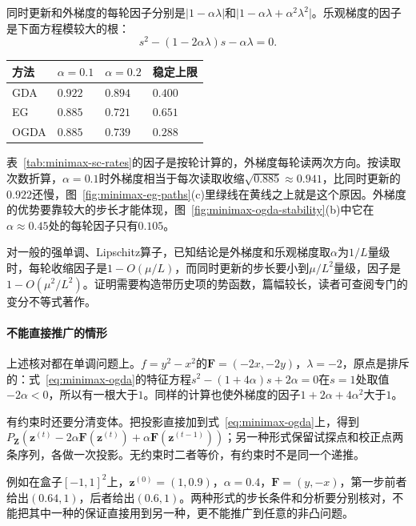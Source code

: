 同时更新和外梯度的每轮因子分别是$\lvert1-\alpha\lambda\rvert$和$\lvert1-\alpha\lambda+\alpha^2\lambda^2\rvert$。乐观梯度的因子是下面方程模较大的根：\[
 s^2-(1-2\alpha\lambda)s-\alpha\lambda=0.
\]

\begin{BookInlineTable}
 \centering
 \begin{tabular}{@{}llll@{}}
  \toprule
  方法 & $\alpha=0.1$ & $\alpha=0.2$ & 稳定上限\\
  \midrule
  GDA & $0.922$ & $0.894$ & $0.400$\\
  EG & $0.885$ & $0.721$ & $0.651$\\
  OGDA & $0.885$ & $0.739$ & $0.288$\\
  \bottomrule
 \end{tabular}
 \caption{$f=\frac12x^2+2xy-\frac12y^2$上三种方法的每轮收缩因子及步长上限（数值求得）。}
 \label{tab:minimax-sc-rates}
\end{BookInlineTable}

表~\ref{tab:minimax-sc-rates}的因子是按轮计算的，外梯度每轮读两次方向。按读取次数折算，$\alpha=0.1$时外梯度相当于每次读取收缩$\sqrt{0.885}\approx0.941$，比同时更新的$0.922$还慢，图~\ref{fig:minimax-eg-paths}(c)里绿线在黄线之上就是这个原因。外梯度的优势要靠较大的步长才能体现，图~\ref{fig:minimax-ogda-stability}(b)中它在$\alpha\approx0.45$处的每轮因子只有$0.105$。

对一般的强单调、Lipschitz算子，已知结论是外梯度和乐观梯度取$\alpha$为$1/L$量级时，每轮收缩因子是$1-O(\mu/L)$，而同时更新的步长要小到$\mu/L^2$量级，因子是$1-O(\mu^2/L^2)$。证明需要构造带历史项的势函数，篇幅较长，读者可查阅专门的变分不等式著作。

\paragraph{不能直接推广的情形}
上述核对都在单调问题上。$f=y^2-x^2$的$\bm{F}=(-2x,-2y)$，$\lambda=-2$，原点是排斥的：式~\eqref{eq:minimax-ogda}的特征方程$s^2-(1+4\alpha)s+2\alpha=0$在$s=1$处取值$-2\alpha<0$，所以有一根大于$1$。同样的计算也使外梯度的因子$1+2\alpha+4\alpha^2$大于$1$。

有约束时还要分清变体。把投影直接加到式~\eqref{eq:minimax-ogda}上，得到$P_{\bm{Z}}(\bm{z}^{(t)}-2\alpha\bm{F}(\bm{z}^{(t)})+\alpha\bm{F}(\bm{z}^{(t-1)}))$；另一种形式保留试探点和校正点两条序列，各做一次投影。无约束时二者等价，有约束时不是同一个递推。

例如在盒子$[-1,1]^2$上，$\bm{z}^{(0)}=(1,0.9)$，$\alpha=0.4$，$\bm{F}=(y,-x)$，第一步前者给出$(0.64,1)$，后者给出$(0.6,1)$。两种形式的步长条件和分析要分别核对，不能把其中一种的保证直接用到另一种，更不能推广到任意的非凸问题。
